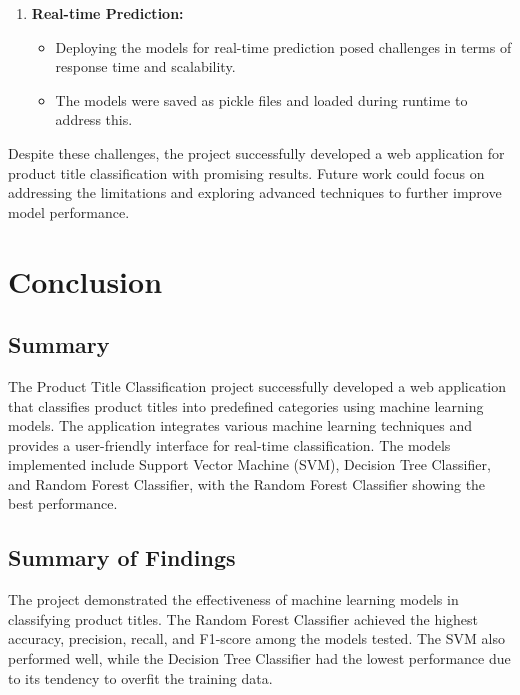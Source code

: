 \documentclass[10pt]{article}
\begin{document}
\begin{enumerate}
    \item \textbf{Real-time Prediction:}
    \begin{itemize}
        \item Deploying the models for real-time prediction posed challenges in terms of response time and scalability.
        \item The models were saved as pickle files and loaded during runtime to address this.
    \end{itemize}
\end{enumerate}

Despite these challenges, the project successfully developed a web application for product title classification with promising results. Future work could focus on addressing the limitations and exploring advanced techniques to further improve model performance.

\section{Conclusion}

\subsection{Summary}
The Product Title Classification project successfully developed a web application that classifies product titles into predefined categories using machine learning models. The application integrates various machine learning techniques and provides a user-friendly interface for real-time classification. The models implemented include Support Vector Machine (SVM), Decision Tree Classifier, and Random Forest Classifier, with the Random Forest Classifier showing the best performance.

\subsection{Summary of Findings}
The project demonstrated the effectiveness of machine learning models in classifying product titles. The Random Forest Classifier achieved the highest accuracy, precision, recall, and F1-score among the models tested. The SVM also performed well, while the Decision Tree Classifier had the lowest performance due to its tendency to overfit the training data.
\end{document}
